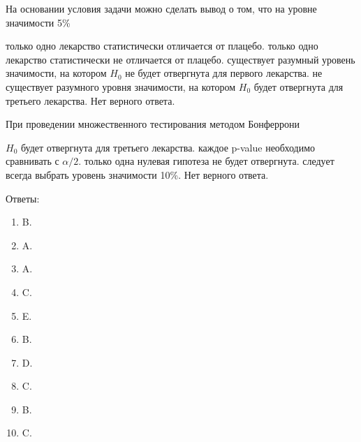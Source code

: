 \documentclass[10pt, a4paper]{exam}
\begin{document}
	\begin{questions}
		\question На основании условия задачи можно сделать вывод о том, что на уровне значимости 5\%
		\begin{choices}
			\choice только одно лекарство статистически отличается от плацебо.
			\choice только одно лекарство статистически не отличается от плацебо.
			\choice существует разумный уровень значимости, на котором $H_0$ не будет отвергнута для первого лекарства.
			\choice не существует разумного уровня значимости, на котором $H_0$ будет отвергнута для третьего лекарства.
			\choice Нет верного ответа.
		\end{choices}
	
		\question При проведении множественного тестирования методом Бонферрони
		\begin{choices}
			\choice $H_0$ будет отвергнута для третьего лекарства.
			\choice каждое p-value необходимо сравнивать с $\alpha / 2$.
			\choice только одна нулевая гипотеза не будет отвергнута.
			\choice следует всегда выбрать уровень значимости 10\%.
			\choice Нет верного ответа.
		\end{choices}
	\end{questions}

	\newpage
	
	Ответы:
	\begin{enumerate}
		\item B.
		\item A.
		\item A.
		\item C.
		\item E.
		\item B.
		\item D.
		\item C.
		\item B.
		\item C.
	\end{enumerate}
\end{document}
